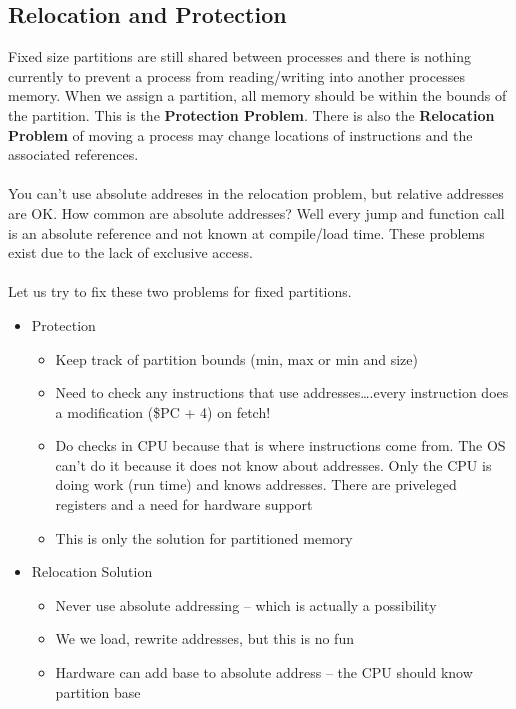 \documentclass[../base_file/cs1550_notes.tex]{subfiles}
\begin{document}
\subsection{Relocation and Protection}
Fixed size partitions are still shared between processes and there is nothing currently
to prevent a process from reading/writing into another processes memory.  When we assign
a partition, all memory should be within the bounds of the partition.  This is the
\textbf{Protection Problem}.  There is also the \textbf{Relocation Problem} of moving 
a process may change locations of instructions and the associated references.\\\\
You can't use absolute addreses in the relocation problem, but relative addresses are OK\@.
How common are absolute addresses?  Well every jump and function call is an absolute
reference and not known at compile/load time.  These problems exist due to the lack of 
exclusive access.\\\\
Let us try to fix these two problems for fixed partitions.  
\begin{itemize}
	\item Protection
		\begin{itemize}
			\item Keep track of partition bounds (min, max or min and size)
   			\item Need to check any instructions that use addresses\dots.every instruction
					does a modification (\$PC + 4) on fetch!
			\item Do checks in CPU because that is where instructions come from.  The OS
					can't do it because it does not know about addresses. Only the CPU
					is doing work (run time) and knows addresses.  There are priveleged
					registers and a need for hardware support
			\item This is only the solution for partitioned memory
		\end{itemize}
	\item Relocation Solution
		\begin{itemize}
			\item Never use absolute addressing -- which is actually a possibility
			\item We we load, rewrite addresses, but this is no fun
			\item Hardware can add base to absolute address -- the CPU should know partition
					base
		\end{itemize}
\end{itemize}
\end{document}
